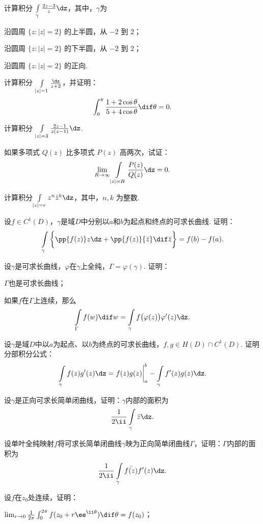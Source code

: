 \begin{xiti}
\item 计算积分 $\int\limits_\gamma\frac{2z-3}z\dz$，其中，$\gamma$为
  \begin{enuma}
    \item 沿圆周 $\{z:|z|=2\}$ 的上半圆，从 $-2$ 到 $2$；
    \item 沿圆周 $\{z:|z|=2\}$ 的下半圆，从 $-2$ 到 $2$；
    \item 沿圆周 $\{z:|z|=2\}$ 的正向.
  \end{enuma}
\item 计算积分 $\int\limits_{|z|=1}\frac{\dz}{z+2}$，并证明：
\[\int_0^\pi\frac{1+2\cos\theta}{5+4\cos\theta}\dif\theta=0.\]
\item 计算积分 $\int\limits_{|z|=3}\frac{2z-1}{z(z-1)}\dz$.
\item 如果多项式 $Q(z)$ 比多项式 $P(z)$ 高两次，试证：
  \[\lim_{R\to\infty}\int\limits_{|z|=R}\frac{P(z)}{Q(z)}\dz=0.\]
\item 计算积分$\int\limits_{|z|=r}z^n\bar z^k\dz$，其中，$n,k$ 为整数.
\item 设$f\in C^1(D)$，$\gamma$是域$D$中分别以$a$和$b$为起点和终点的可求长曲线. 证明：
  \[\int\limits_\gamma\bigg\{\pp{f(z)}z\dz+\pp{f(z)}{\bar z}\dif \bar z\bigg\}=f(b)-f(a).\]
\item 设$\gamma$是可求长曲线，$\varphi$在$\gamma$上全纯，$\Gamma=\varphi(\gamma)$. 证明：
  \begin{enuma}
    \item $\Gamma$也是可求长曲线；
    \item 如果$f$在$\Gamma$上连续，那么
    \[\int\limits_\Gamma f(w)\dif w=\int\limits_\gamma f\big(\varphi(z)\big)\varphi'(z)\dz.\]
  \end{enuma}
\item 设$\gamma$是域$D$中以$a$为起点、以$b$为终点的可求长曲线，$f,g\in H(D)\cap C^1(D)$. 证明分部积分公式：
    \[\int\limits_\gamma f(z)g'(z)\dz=f(z)g(z)\bigg|_a^b-\int\limits_\gamma f'(z)g(z)\dz.\]
\item 设$\gamma$是正向可求长简单闭曲线，证明：$\gamma$内部的面积为
  \[\frac1{2\ii}\int\limits_\gamma\bar z\dz.\]
\item 设单叶全纯映射$f$将可求长简单闭曲线$\gamma$映为正向简单闭曲线$\Gamma$，证明：$\Gamma$内部的面积为
  \[\frac1{2\ii}\int\limits_\gamma\bar{f(z)}f'(z)\dz.\]
\item 设$f$在$z_0$处连续，证明：
  \begin{enuma}
    \item $\lim_{r\to0}\frac1{2\pi}\int_0^{2\pi}f(z_0+r\ee^{\ii\theta})\dif\theta=f(z_0)$；

\end{enuma}
\end{xiti}
